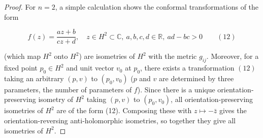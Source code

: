 \begin{proof}
  For $n=2$, a simple calculation shows the conformal transformations of the form


  $$
  f(z)=\frac{az+b}{cz+d},\quad z\in H^2\subset\mathbb{C},\ a,b,c,d\in\mathbb{R},\ ad-bc>0\qquad(12)
  $$


  (which map $H^2$ onto $H^2$) are isometries of $H^2$ with the metric $g_{ij}$.
  Moreover, for a fixed point $p_0\in H^2$ and unit vector $v_0$ at $p_0$, there
  exists a transformation $(12)$ taking an arbitrary $(p,v)$ to $(p_0,v_0)$ ($p$ and
  $v$ are determined by three parameters, the number of parameters of $f$). Since
  there is a unique orientation-preserving isometry of $H^2$ taking $(p,v)$ to
  $(p_0,v_0)$, all orientation-preserving isometries of $H^2$ are of the form (12).
  Composing these with $z\mapsto-\bar z$ gives the orientation-reversing
  anti-holomorphic isometries, so together they give all isometries of $H^2$.

\end{proof}

